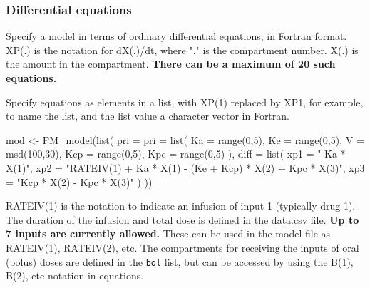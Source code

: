 \documentclass[
]{book}
\newenvironment{Shaded}{\begin{snugshade}}{\end{snugshade}}
\newcommand{\AttributeTok}[1]{\textcolor[rgb]{0.77,0.63,0.00}{#1}}
\newcommand{\DecValTok}[1]{\textcolor[rgb]{0.00,0.00,0.81}{#1}}
\newcommand{\FunctionTok}[1]{\textcolor[rgb]{0.00,0.00,0.00}{#1}}
\newcommand{\NormalTok}[1]{#1}
\newcommand{\OtherTok}[1]{\textcolor[rgb]{0.56,0.35,0.01}{#1}}
\newcommand{\StringTok}[1]{\textcolor[rgb]{0.31,0.60,0.02}{#1}}
\begin{document}
\hypertarget{differential-equations}{%
\subsubsection{Differential equations}\label{differential-equations}}

Specify a model in terms of ordinary differential equations, in Fortran format. XP(.) is the notation for dX(.)/dt, where "." is the
compartment number. X(.) is the amount in the compartment. \textbf{There can
be a maximum of 20 such equations.}

Specify equations as elements in a list, with XP(1) replaced by XP1, for example, to name the list, and the list value a character vector in Fortran.

\begin{Shaded}
\begin{Highlighting}[]
\NormalTok{mod }\OtherTok{\textless{}{-}} \FunctionTok{PM\_model}\NormalTok{(}\FunctionTok{list}\NormalTok{(}
  \AttributeTok{pri =} \AttributeTok{pri =} \FunctionTok{list}\NormalTok{(}
    \AttributeTok{Ka =} \FunctionTok{range}\NormalTok{(}\DecValTok{0}\NormalTok{,}\DecValTok{5}\NormalTok{),}
    \AttributeTok{Ke =} \FunctionTok{range}\NormalTok{(}\DecValTok{0}\NormalTok{,}\DecValTok{5}\NormalTok{),}
    \AttributeTok{V =} \FunctionTok{msd}\NormalTok{(}\DecValTok{100}\NormalTok{,}\DecValTok{30}\NormalTok{),}
    \AttributeTok{Kcp =} \FunctionTok{range}\NormalTok{(}\DecValTok{0}\NormalTok{,}\DecValTok{5}\NormalTok{),}
    \AttributeTok{Kpc =} \FunctionTok{range}\NormalTok{(}\DecValTok{0}\NormalTok{,}\DecValTok{5}\NormalTok{)}
\NormalTok{  ),}
  \AttributeTok{diff =} \FunctionTok{list}\NormalTok{(}
    \AttributeTok{xp1 =} \StringTok{"{-}Ka * X(1)"}\NormalTok{,}
    \AttributeTok{xp2 =} \StringTok{"RATEIV(1) + Ka * X(1) {-} (Ke + Kcp) * X(2) + Kpc * X(3)"}\NormalTok{,}
    \AttributeTok{xp3 =} \StringTok{"Kcp * X(2) {-} Kpc * X(3)"}
\NormalTok{  )}
\NormalTok{))}
\end{Highlighting}
\end{Shaded}

RATEIV(1) is the notation to indicate an infusion of input 1 (typically drug 1). The duration of the infusion and total dose is defined in the data.csv file. \textbf{Up to 7 inputs are currently
allowed.} These can be used in the model file as RATEIV(1), RATEIV(2), etc. The compartments for receiving the inputs of oral (bolus) doses are defined in the \texttt{bol} list, but can be accessed by using the B(1), B(2), etc notation in equations.
\end{document}
